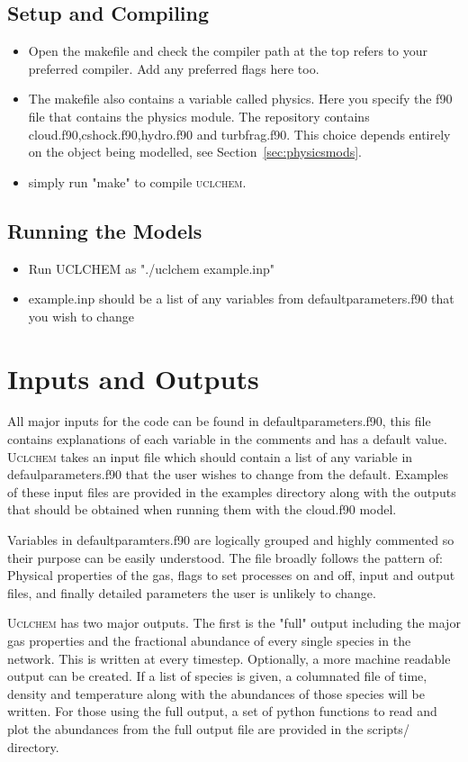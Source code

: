 \documentclass{llncs}
\begin{document}
\subsection{Setup and Compiling}
\begin{itemize}
\item Open the makefile and check the compiler path at the top refers to your preferred compiler. Add any preferred flags here too.
\item The makefile also contains a variable called physics. Here you specify the f90 file that contains the physics module. The repository contains cloud.f90,cshock.f90,hydro.f90 and turbfrag.f90. This choice depends entirely on the object being modelled, see Section~\ref{sec:physicsmods}.
\item simply run "make" to compile \textsc{uclchem}.
\end{itemize}
%
\subsection{Running the Models}
\begin{itemize}
\item Run UCLCHEM as "./uclchem example.inp"
\item example.inp should be a list of any variables from defaultparameters.f90 that you wish to change
\end{itemize}
%
%
\section{Inputs and Outputs}
\label{sec:output}
All major inputs for the code can be found in defaultparameters.f90, this file contains explanations of each variable in the comments and has a default value. \textsc{Uclchem}  takes an input file which should contain a list of any variable in defaulparameters.f90 that the user wishes to change from the default. Examples of these input files are provided in the examples directory along with the outputs that should be obtained when running them with the cloud.f90 model.\par
%
Variables  in defaultparamters.f90 are logically grouped and highly commented so their purpose can be easily understood. The file broadly follows the pattern of: Physical properties of the gas, flags to set processes on and off, input and output files, and finally detailed parameters the user is unlikely to change.\par
%
\textsc{Uclchem} has two major outputs. The first is the "full" output including the major gas properties and the fractional abundance of every single species in the network. This is written at every timestep. Optionally, a more machine readable output can be created. If a list of species is given, a columnated file of time, density and temperature along with the abundances of those species will be written. For those using the full output, a set of python functions to read and plot the abundances from the full output file are provided in the scripts/ directory.\par
%
\end{document}
